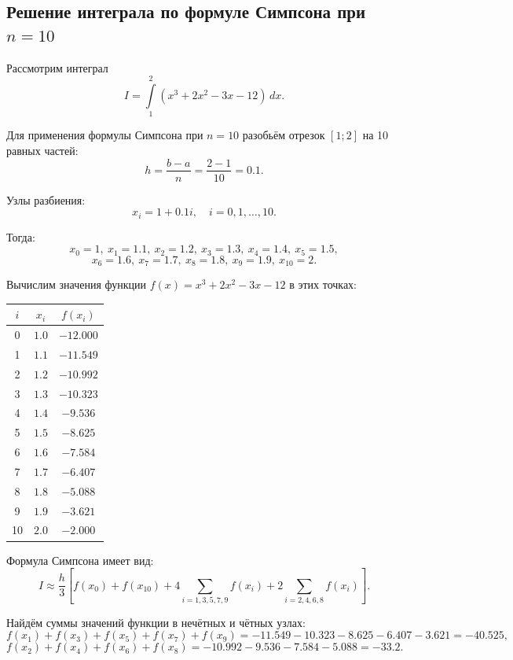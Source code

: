 \documentclass[12pt]{report}
\begin{document}
	\subsection*{Решение интеграла по формуле Симпсона при $n=10$}
	
	\begin{flushleft}
		Рассмотрим интеграл
		\[
		I=\int\limits_{1}^{2}(x^3+2x^2-3x-12)\,dx.
		\]
		
		Для применения формулы Симпсона при $n=10$ разобьём отрезок $[1;2]$ на 10 равных частей:
		\[
		h=\frac{b-a}{n}=\frac{2-1}{10}=0.1.
		\]
		
		Узлы разбиения:
		\[
		x_i=1+0.1i,\quad i=0,1,\dots,10.
		\]
		
		Тогда:
		\[
		x_0=1,\ x_1=1.1,\ x_2=1.2,\ x_3=1.3,\ x_4=1.4,\ x_5=1.5,
		\]
		\[
		x_6=1.6,\ x_7=1.7,\ x_8=1.8,\ x_9=1.9,\ x_{10}=2.
		\]
		
		Вычислим значения функции $f(x)=x^3+2x^2-3x-12$ в этих точках:
		
		\begin{center}
			\begin{tabular}{|c|c|c|}
				\hline
				$i$ & $x_i$ & $f(x_i)$ \\
				\hline
				0 & $1.0$ & $-12.000$ \\
				\hline
				1 & $1.1$ & $-11.549$ \\
				\hline
				2 & $1.2$ & $-10.992$ \\
				\hline
				3 & $1.3$ & $-10.323$ \\
				\hline
				4 & $1.4$ & $-9.536$ \\
				\hline
				5 & $1.5$ & $-8.625$ \\
				\hline
				6 & $1.6$ & $-7.584$ \\
				\hline
				7 & $1.7$ & $-6.407$ \\
				\hline
				8 & $1.8$ & $-5.088$ \\
				\hline
				9 & $1.9$ & $-3.621$ \\
				\hline
				10 & $2.0$ & $-2.000$ \\
				\hline
			\end{tabular}
		\end{center}
		
		Формула Симпсона имеет вид:
		\[
		I \approx \frac{h}{3}\left[f(x_0)+f(x_{10})+4\sum_{i=1,3,5,7,9}f(x_i)+2\sum_{i=2,4,6,8}f(x_i)\right].
		\]
		
		Найдём суммы значений функции в нечётных и чётных узлах:
		\[
		f(x_1)+f(x_3)+f(x_5)+f(x_7)+f(x_9)
		=-11.549-10.323-8.625-6.407-3.621=-40.525,
		\]
		\[
		f(x_2)+f(x_4)+f(x_6)+f(x_8)
		=-10.992-9.536-7.584-5.088=-33.2.
		\]
		

\end{flushleft}
\end{document}
